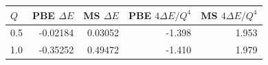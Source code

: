 \begin{tabular}{lrrrr}
\toprule
$Q$ & PBE $\Delta E$ & MS $\Delta E$ & PBE $4\Delta E/Q^4$ & MS $4\Delta E/Q^4$ \\
\midrule
0.5 & -0.02184 & 0.03052 & -1.398 & 1.953 \\
1.0 & -0.35252 & 0.49472 & -1.410 & 1.979 \\
\bottomrule
\end{tabular}

